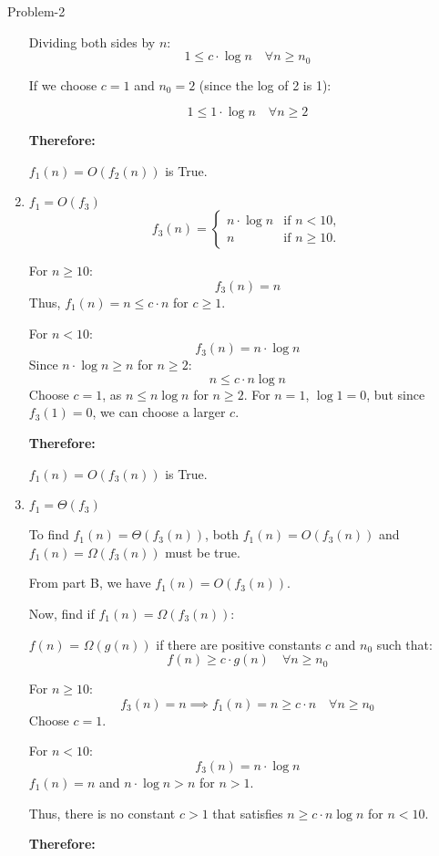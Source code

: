 \begin{problem}{}{Problem-2}
\begin{enumerate}[label=(\alph*)]
		Dividing both sides by \(n\):
		\[
		1 \leq c \cdot \log n \quad \forall n \geq n_0
		\]
		
		If we choose \(c = 1\) and \(n_0 = 2\) (since the log of 2 is 1):
		
		\[
		1 \leq 1 \cdot \log n \quad \forall n \geq 2
		\]
		
		
		\textbf{Therefore:}
		
		\(f_1(n) = O(f_2(n))\) is True.
		
		\item \textbf{\(f_1 = O(f_3)\) }
		\[
		f_3(n) = 
		\begin{cases} 
			n \cdot \log n & \text{if } n < 10, \\
			n & \text{if } n \geq 10. 
		\end{cases}
		\]
		
		
		For \(n \geq 10\):
		\[
		f_3(n) = n
		\]
		Thus, \(f_1(n) = n \leq c \cdot n\) for \(c \geq 1\).
		
		For \(n < 10\):
		\[
		f_3(n) = n \cdot \log n
		\]
		Since \(n \cdot \log n \geq n\) for \(n \geq 2\):
		\[
		n \leq c \cdot n \log n
		\]
		Choose \(c = 1\), as \(n \leq n \log n\) for \(n \geq 2\). For \(n = 1\), \(\log 1 = 0\), but since \(f_3(1) = 0\), we can choose a larger \(c\).
		
		\textbf{Therefore:}
		
		\(f_1(n) = O(f_3(n))\) is True.
		
		\item \textbf{\(f_1 = \Theta(f_3)\)}
		
		To find \(f_1(n) = \Theta(f_3(n))\), both \(f_1(n) = O(f_3(n))\) and \(f_1(n) = \Omega(f_3(n))\) must be true.
		
		From part B, we have \(f_1(n) = O(f_3(n))\).
		
		Now, find if \(f_1(n) = \Omega(f_3(n))\):
		
		\(f(n)\) = \(\Omega(g(n))\) if there are positive constants \(c\) and \(n_0\) such that:
		\[
		f(n) \geq c \cdot g(n) \quad \forall n \geq n_0
		\]
		
		For \(n \geq 10\):
		\[
		f_3(n) = n \implies f_1(n) = n \geq c \cdot n \quad \forall n \geq n_0
		\]
		Choose \(c = 1\).
		
		For \(n < 10\):
		\[
		f_3(n) = n \cdot \log n
		\]
		\(f_1(n) = n\) and \(n \cdot \log n > n\) for \(n > 1\).
		
		Thus, there is no constant \(c > 1\) that satisfies \(n \geq c \cdot n \log n\) for \(n < 10\).
		
		\textbf{Therefore:}
		

\end{enumerate}
\end{problem}
